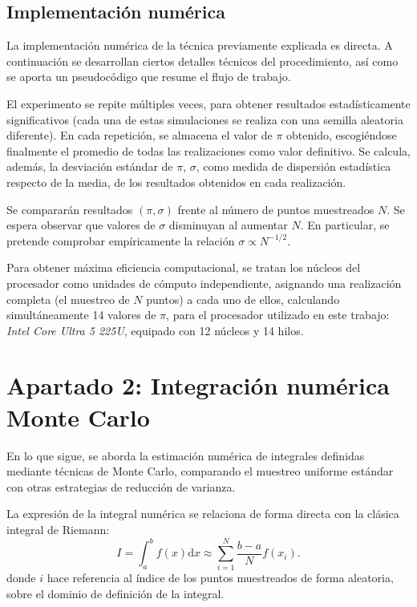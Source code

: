 \documentclass[11pt, a4paper]{article}
\begin{document}
\subsection{Implementación numérica}
La implementación numérica de la técnica previamente explicada es directa. A continuación se desarrollan ciertos detalles técnicos del procedimiento, así como se aporta un pseudocódigo que resume el flujo de trabajo.

El experimento se repite múltiples veces, para obtener resultados estadísticamente significativos (cada una de estas simulaciones se realiza con una semilla aleatoria diferente). En cada repetición, se almacena el valor de $\pi$ obtenido, escogiéndose finalmente el promedio de todas las realizaciones como valor definitivo. Se calcula, además, la desviación estándar de $\pi$, $\sigma$, como medida de dispersión estadística respecto de la media, de los resultados obtenidos en cada realización.

Se compararán resultados $(\pi, \sigma)$ frente al número de puntos muestreados $N$. Se espera observar que valores de $\sigma$ disminuyan al aumentar $N$. En particular, se pretende comprobar empíricamente la relación $\sigma \propto N^{-1/2}$.

Para obtener máxima eficiencia computacional, se tratan los núcleos del procesador como unidades de cómputo independiente, asignando una realización completa (el muestreo de $N$ puntos) a cada uno de ellos, calculando simultáneamente 14 valores de $\pi$, para el procesador utilizado en este trabajo: \textit{Intel Core Ultra 5 225U}, equipado con 12 núcleos y 14 hilos.


\section{Apartado 2: Integración numérica Monte Carlo}
En lo que sigue, se aborda la estimación numérica de integrales definidas mediante técnicas de Monte Carlo, comparando el muestreo uniforme estándar con otras estrategias de reducción de varianza.

La expresión de la integral numérica se relaciona de forma directa con la clásica integral de Riemann:
\begin{equation}
 I = \int_a^b f(x) \mathrm{d} x \approx \sum_{i=1}^N \frac{b-a}{N}f(x_i).
\end{equation}
donde $i$ hace referencia al índice de los puntos muestreados de forma aleatoria, sobre el dominio de definición de la integral.
\end{document}
